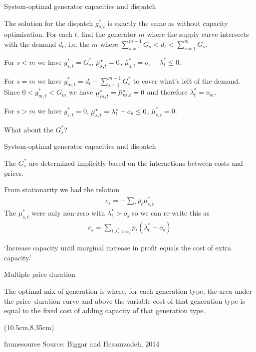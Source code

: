 \documentclass[10pt,aspectratio=169,dvipsnames]{beamer}
\def\l{\lambda}
\def\m{\mu}
\newcommand{\ubar}[1]{\text{\b{$#1$}}}
\newcommand{\source}[1]{\begin{textblock*}{5cm}(10.5cm,8.35cm)
    \begin{beamercolorbox}[ht=0.5cm,right]{framesource}
        \usebeamerfont{framesource}\usebeamercolor[fg]{framesource} Source: {#1}
    \end{beamercolorbox}
\end{textblock*}}
\begin{document}
\begin{frame}{System-optimal generator capacities and dispatch}

  The solution for the dispatch $g_{s,t}^*$ is exactly the same as
  without capacity optimisation. For each $t$, find the generator $m$
  where the supply curve intersects with the demand $d_t$, i.e. the $m$
  where   $\sum_{s=1}^{m-1} G_s < d_t < \sum_{s=1}^{m} G_s$.

  For $s < m$ we have $g_{s,t}^* = G_s^*$, $\ubar{\m}^*_{s,t} = 0$,
  $\bar{\m}^*_{s,t} = o_s - \l_t^* \leq 0$.

  For $s = m$ we have $g_{m,t}^* = d_t - \sum_{s=1}^{m-1} G_s^*$ to cover
  what's left of the demand. Since $0 < g_{m,t}^* < G_m$ we have
  $\ubar{\m}^*_{m,t} = \bar{\m}^*_{m,t} = 0$ and therefore $\l_t^* = o_m$.

  For $s > m$ we have $g_{s,t}^* = 0$,
  $\ubar{\m}^*_{s,t} = \l_t^*-o_s \leq 0 $, $\bar{\m}^*_{s,t} = 0$.

  What about the $G_s^*$?


\end{frame}



\begin{frame}{System-optimal generator capacities and dispatch}

  The $G_s^*$ are determined implicitly based on the interactions between costs and prices.

  From stationarity we had the relation
    \begin{align*}
      c_s  = - \sum_t p_t \bar{\m}^*_{s,t}
    \end{align*}
    The $\bar{\m}^*_{s,t}$ were only non-zero with $\l^*_{t} > o_s$ so we can re-write this as
    \begin{align*}
      c_s  = \sum_{t| \l^*_{t} > o_s} p_t (\l^*_{t} - o_s)
    \end{align*}

  `Increase capacity until marginal increase in profit equals the cost of extra capacity.'

\end{frame}


\begin{frame}{Multiple price duration}

  The optimal mix of generation is where, for each generation type,
  the area under the price–duration curve and above the variable cost
  of that generation type is equal to the fixed cost of adding
  capacity of that generation type.

  \centering

  \source{Biggar and Hesamzadeh, 2014}
\end{frame}
\end{document}

